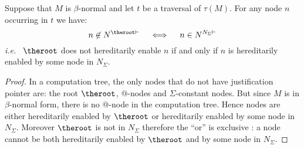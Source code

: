 \begin{lemma}
\label{lem:betanorm_enabling}
Suppose that $M$ is $\beta$-normal and let $t$ be a traversal of $\tau(M)$.
For any node $n$ occurring in $t$ we have:
$$ n \not\in N^{\theroot\vdash} \quad \iff \quad n \in N^{N_{\Sigma}\vdash}$$
{\it i.e.}~ $\theroot$ does not hereditarily enable $n$ if and only if $n$ is
hereditarily enabled by some node in $N_\Sigma$.
\end{lemma}
\begin{proof}
 In a computation tree, the only nodes that do not have justification pointer are:
the root $\theroot$, @-nodes and $\Sigma$-constant nodes. But since $M$ is
in $\beta$-normal form, there is no @-node in the computation tree.
Hence nodes are either hereditarily enabled by $\theroot$ or hereditarily
enabled by some node in $N_\Sigma$. Moreover $\theroot$ is not in $N_\Sigma$
therefore the ``or'' is exclusive : a node cannot be both hereditarily
enabled by $\theroot$ and by some node in $N_\Sigma$.
\end{proof}


